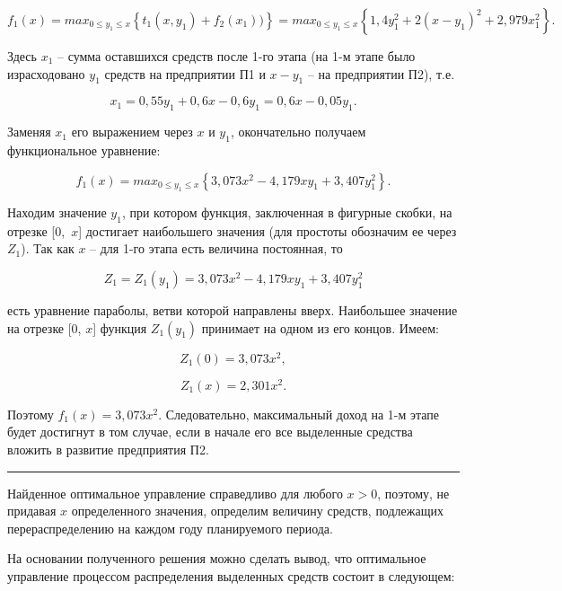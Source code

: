 \documentclass[12pt]{article}
\begin{document}
$$ f_1 ( x ) = max_{ 0 \le y_1 \le x }{\left\{ t_1 ( x, y_1 ) + f_2 ( x_1 ) )\right\}}= max_{ 0 \le y_1 \le x }{\left\{ 1{,}4 y_{1}^{2} + 2 \left(x - y_{1}\right)^{2} + 2{,}979 x_{1}^{2} \right\}}.$$

Здесь $ x_1 $ – сумма оставшихся средств после 1-го этапа (на 1-м этапе было израсходовано $ y_{1} $ средств на предприятии П1 и $ x - y_{1} $ – на предприятии П2), т.е.

$$ x_1 = 0{,}55 y_{1} + 0{,}6 x - 0{,}6 y_{1} = 0{,}6 x - 0{,}05 y_{1} .$$

Заменяя $ x_1 $ его выражением через $ x $ и $ y_{1} $, окончательно получаем функциональное уравнение:

$$ f_1 ( x ) = max_{ 0 \le y_1 \le x }{\left\{ 3{,}073 x^{2} - 4{,}179 x y_{1} + 3{,}407 y_{1}^{2} \right\}}.$$

Находим значение $ y_{1} $, при котором функция, заключенная в фигурные скобки, на отрезке [0,~$ x $] достигает наибольшего значения (для простоты обозначим ее через $ Z_1 $). Так как $ x $ – для 1-го этапа есть величина постоянная, то

$$ Z_1 = Z_1 ( y_1 ) =  3{,}073 x^{2} - 4{,}179 x y_{1} + 3{,}407 y_{1}^{2} $$

есть уравнение параболы, ветви которой направлены вверх. Наибольшее значение на отрезке [0, $ x $] функция $ Z_1 ( y_1 ) $ принимает на одном из его концов. Имеем:

$$ Z_1 ( 0 ) = 3{,}073 x^{2}, $$

$$ Z_1 ( x ) = 2{,}301 x^{2}. $$

Поэтому $ f_1 ( x ) = 3{,}073 x^{2} $. Следовательно, максимальный доход на 1-м этапе будет достигнут в том случае, если в начале его все выделенные средства вложить в развитие предприятия П2.

\noindent\rule{\textwidth}{1pt}\newline

Найденное оптимальное управление справедливо для любого $ x > 0 $, поэтому, не придавая $ x $ определенного значения, определим величину средств, подлежащих перераспределению на каждом году планируемого периода.

На основании полученного решения можно сделать вывод, что оптимальное управление процессом распределения выделенных средств состоит в следующем:
\end{document}
